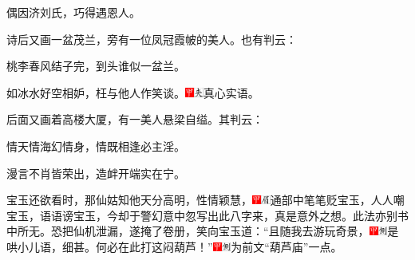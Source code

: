 偶因济刘氏，巧得遇恩人。

诗后又画一盆茂兰，旁有一位凤冠霞帔的美人。也有判云：

桃李春风结子完，到头谁似一盆兰。

如冰水好空相妒，枉与他人作笑谈。{\includegraphics[width=3mm]{../Images/00002}\includegraphics[width=3mm]{../Images/00012}\footnotesize \kaishu 真心实语。}

后面又画着高楼大厦，有一美人悬梁自缢。其判云：

情天情海幻情身，情既相逢必主淫。

漫言不肖皆荣出，造衅开端实在宁。

宝玉还欲看时，那仙姑知他天分高明，性情颖慧，{\includegraphics[width=3mm]{../Images/00002}\includegraphics[width=3mm]{../Images/00010}\footnotesize \kaishu 通部中笔笔贬宝玉，人人嘲宝玉，语语谤宝玉，今却于警幻意中忽写出此八字来，真是意外之想。此法亦别书中所无。}恐把仙机泄漏，遂掩了卷册，笑向宝玉道：``且随我去游玩奇景，{\includegraphics[width=3mm]{../Images/00002}\includegraphics[width=3mm]{../Images/00011}\footnotesize \kaishu 是哄小儿语，细甚。}何必在此打这闷葫芦！''{\includegraphics[width=3mm]{../Images/00002}\includegraphics[width=3mm]{../Images/00011}\footnotesize \kaishu 为前文``葫芦庙''一点。}

